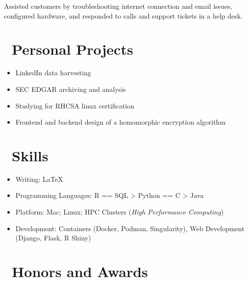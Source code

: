 \documentclass{resume}
\begin{document}
 {}
Assisted customers by troubleshooting internet connection and email issues, configured hardware, and responded to calls and support tickets in a help desk.


\section{\faUser\ Personal Projects}
\begin{itemize}[parsep=0.5ex]
  \item LinkedIn data harvesting
  \item SEC EDGAR archiving and analysis
  \item Studying for RHCSA linux certification 
  \item Frontend and backend design of a homomorphic encryption algorithm
\end{itemize}


\section{\faCogs\ Skills}
\begin{itemize}[parsep=0.5ex]
  \item Writing: \LaTeX
  \item Programming Languages: R == SQL > Python == C > Java
  \item Platform: Mac; Linux; HPC Clusters (\emph{High Performance Computing}) 
  \item Development: Containers (Docker, Podman, Singularity), Web Development (Django, Flask, R Shiny)
\end{itemize}


\section{\faHeartO\ Honors and Awards}


\end{document}

